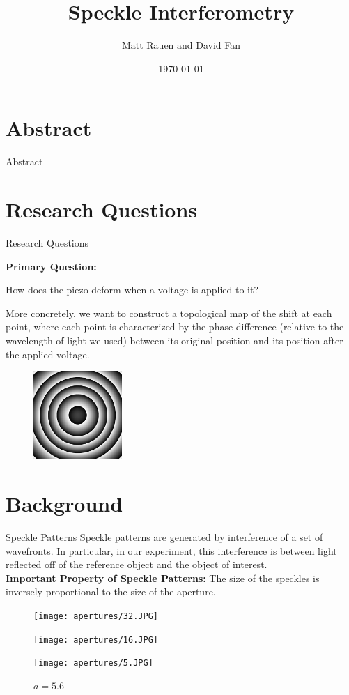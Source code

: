 \documentclass[pdf]{beamer}
\title{Speckle Interferometry}
\author{Matt Rauen and David Fan}
\date{\today}
\begin{document}
\begin{frame}
\titlepage
\end{frame}

\section{Abstract}
\begin{frame}{Abstract}

\end{frame}

\section{Research Questions}
\begin{frame}{Research Questions}
\begin{center}
{\bf Primary Question:}

How does the piezo deform when a voltage is applied to it?
\end{center}
More concretely, we want to construct a topological map of the shift at each point, where each point is characterized by the phase difference (relative to the wavelength of light we used) between its original position and its position after the applied voltage.
\begin{figure}[htbp]
\centering
\includegraphics[width=0.3\textwidth]{gaussian_bump.png}
\end{figure}
\end{frame}

\section{Background}
\begin{frame}{Speckle Patterns}
Speckle patterns are generated by interference of a set of wavefronts. In particular, in our experiment, this interference is between light reflected off of the reference object and the object of interest.\\
\vspace{0.5cm}
{\bf Important Property of Speckle Patterns:}
The size of the speckles is inversely proportional to the size of the aperture.
\begin{figure}[!htb]
  \texttt{[image: apertures/32.JPG]}
  \caption{$a=32$}
\endminipage\hfill
{}
  \texttt{[image: apertures/16.JPG]}
  \caption{$a=16$}
\endminipage\hfill
{}
  \texttt{[image: apertures/5.JPG]}
  \caption{$a=5.6$}
\endminipage
\end{figure}
\end{frame}
\end{document}
